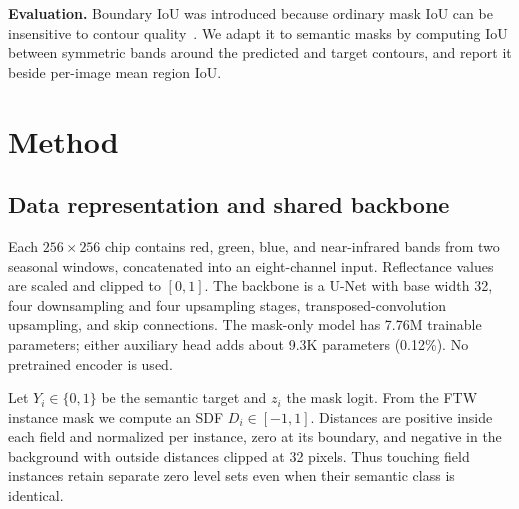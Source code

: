 \documentclass[10pt,twocolumn,letterpaper]{article}
\begin{document}
\textbf{Evaluation.} Boundary IoU was introduced because ordinary mask IoU can be insensitive to contour quality~\cite{cheng2021boundaryiou}. We adapt it to semantic masks by computing IoU between symmetric bands around the predicted and target contours, and report it beside per-image mean region IoU.

\section{Method}
\subsection{Data representation and shared backbone}
Each $256\!\times\!256$ chip contains red, green, blue, and near-infrared bands from two seasonal windows, concatenated into an eight-channel input. Reflectance values are scaled and clipped to $[0,1]$. The backbone is a U-Net with base width 32, four downsampling and four upsampling stages, transposed-convolution upsampling, and skip connections. The mask-only model has 7.76M trainable parameters; either auxiliary head adds about 9.3K parameters (0.12\%). No pretrained encoder is used.

\begin{center}
\vspace{-2pt}
\vspace{-5pt}
\end{center}

Let $Y_i\in\{0,1\}$ be the semantic target and $z_i$ the mask logit. From the FTW instance mask we compute an SDF $D_i\in[-1,1]$. Distances are positive inside each field and normalized per instance, zero at its boundary, and negative in the background with outside distances clipped at 32 pixels. Thus touching field instances retain separate zero level sets even when their semantic class is identical.
\end{document}
